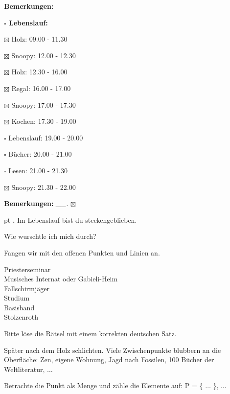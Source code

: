 \documentclass[10pt,a4paper]{article}
\newcounter{notec}
\newcommand\notep[1]{%
  \stepcounter{notec}
  \vskip #1pt
  {\bf\arabic{notec}.}
}
\newcommand\prop[1] {{\color {alizarin} {\bf #1}}}        %
\newcommand\mand[1] {{\color {burntorange} {\bf #1}}}     %
\newcommand\bottomspace{\vskip 4pt}
\newcommand\n[1] { {\sl #1.} \hskip 5pt }
\begin{document}
\begin{mdframed}[style=daystyle]
\begin{labeling}{{\mand {Bemerkungen:}}}
\begin{minipage}{0.75\textwidth}
\begin{labeling}{\prop {$\square$ {Lebenslauf:}}}
      \item[$\boxtimes$ Holz:]       09.00 - 11.30        
      \item[$\boxtimes$ Snoopy:]     12.00 - 12.30
      \item[$\boxtimes$ Holz:]       12.30 - 16.00        
      \item[$\boxtimes$ Regal:]      16.00 - 17.00        
      \item[$\boxtimes$ Snoopy:]     17.00 - 17.30
      \item[$\boxtimes$ Kochen:]     17.30 - 19.00
      \item[$\square$ Lebenslauf:] 19.00 - 20.00
      \item[$\square$ Bücher:]     20.00 - 21.00
      \item[$\square$ Lesen:]      21.00 - 21.30        
      \item[$\boxtimes$ Snoopy:]     21.30 - 22.00
      \end{labeling}
    \end{minipage}
    \bottomspace
  \item[{\mand {Bemerkungen:}}]   \n{\_\_} $\boxtimes$
  \end{labeling}
    
  \setcounter{notec}{0}
  
  \notep 0 Im Lebenslauf bist du steckengeblieben.

  \vskip 2pt
  Wie wurschtle ich mich durch?

  \vskip 2pt
  Fangen wir mit den offenen Punkten und Linien an.

  \vskip 2pt
  Priesterseminar \\
  Musisches Internat oder Gabieli-Heim \\
  Fallschirmjäger \\
  Studium \\
  Basisband \\
  Stolzenroth

  \vskip 2pt
  Bitte löse die Rätsel mit einem korrekten deutschen Satz.

  \vskip 2pt
  Später nach dem Holz schlichten. Viele Zwischenpunkte blubbern an die
  Oberfläche: Zen, eigene Wohnung, Jagd nach Fossilen, 100 Bücher der
  Weltliteratur, $\ldots$

  \vskip 2pt
  Betrachte die Punkt als Menge und zähle die Elemente auf: P = \{ $\ldots$ \}, $\ldots$
  
\end{mdframed}
\end{document}
